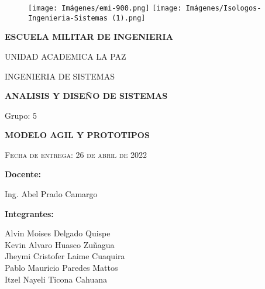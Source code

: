 \thispagestyle{empty}
			\begin{figure}[ht]
				\texttt{[image: Imágenes/emi-900.png]}
				\label{escudoTecNM}
		   \endminipage
		   \minipage{\textwidth}
				\texttt{[image: Imágenes/Isologos-Ingenieria-Sistemas (1).png]}
				\label{EscudoSistemas}
			\endminipage
		\end{figure}
		
		\vspace{0.1cm}
		
		\begin{center}
		    {\scshape\LARGE \textbf{ESCUELA MILITAR DE INGENIERIA} \par}
			{\scshape\Large UNIDAD ACADEMICA LA PAZ \par}
			{\scshape\large INGENIERIA DE SISTEMAS \par}
            \vspace{0.75cm}
             {\Large \textbf{ANALISIS Y DISEÑO DE SISTEMAS}}

			\begin{center}
			
			
			{\Large Grupo:  5}
			\vspace{0.75cm}
				
			{\LARGE\bfseries MODELO AGIL Y PROTOTIPOS}
            \vspace{0.75cm}
            
		{\scshape\Large Fecha de entrega: 26 de abril de 2022\par}	
        \vspace{0.5cm}
	    \LARGE	{ \textbf{Docente:}}\par
        \large		{Ing. Abel Prado Camargo}
        
		\vspace{0.2cm}	
		
		\LARGE	{ \textbf{Integrantes:}}\par
        \large	 {Alvin Moises Delgado Quispe}\\ 
        \large	 {Kevin Alvaro Huasco Zuñagua}\\
        \large	 {Jheymi Cristofer Laime Cuaquira}\\
        \large	 {Pablo Mauricio Paredes Mattos}\\
        \large	 {Itzel Nayeli Ticona Cahuana}\\        

				\vspace{2.5cm}
				\vspace{0.9cm}
				
			\end{center}
	
		\end{center}